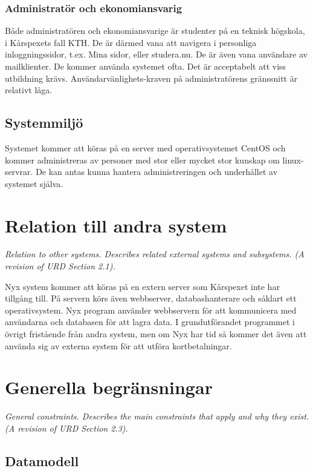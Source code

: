 \documentclass[a4paper, twoside, 11pt, titlepage]{article}
\begin{document}
		\subsubsection{Administratör och ekonomiansvarig}


		Både administratören och ekonomiansvarige är studenter på en teknisk högskola, i Kårspexets fall KTH. De är därmed vana att navigera i personliga inloggningssidor, t.ex. Mina sidor, eller studera.nu. De är även vana användare av mailklienter. De kommer använda systemet ofta. Det är acceptabelt att viss utbildning krävs. Användarvänlighets-kraven på administratörens gränssnitt är relativt låga.

	\subsection{Systemmiljö}


	Systemet kommer att köras på en server med operativsystemet CentOS och kommer administreras av personer med stor eller mycket stor kunskap om linux-servrar. De kan antas kunna hantera administreringen och underhållet av systemet själva.

\clearpage
\section{Relation till andra system}


\emph{Relation to other systems. Describes related external systems and subsystems. (A revision of URD Section 2.1).}

Nyx system kommer att köras på en extern server som Kårspexet inte har tillgång till. På servern körs även webbserver, databashanterare och såklart ett operativsystem. Nyx program använder webbservern för att kommunicera med användarna och databasen för att lagra data. I grundutförandet programmet i övrigt fristående från andra system, men om Nyx har tid så kommer det även att använda sig av externa system för att utföra kortbetalningar.

\clearpage
\section{Generella begränsningar}


\emph{General constraints. Describes the main constraints that apply and why they exist. (A revision of URD Section 2.3).}

	\subsection{Datamodell}
\end{document}
